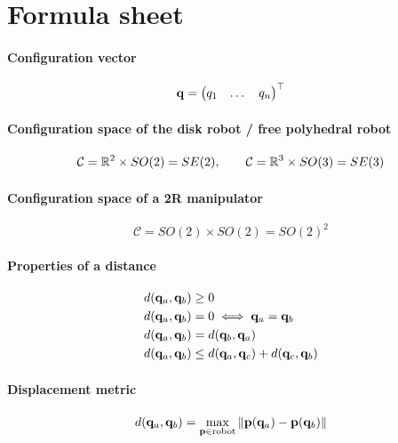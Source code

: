 \chapter*{Formula sheet}

\subsubsection{Configuration vector}
\begin{equation*}
    {\mathbf q}=\begin{pmatrix} q_1 & \dots & q_n \end{pmatrix}^\top
\end{equation*}

\subsubsection{Configuration space of the disk robot / free polyhedral robot}
\begin{equation*}
    \mathcal C={\mathbb R}^2\times SO(2)=SE(2),\qquad \mathcal C={\mathbb R}^3\times SO(3)=SE(3)
\end{equation*}

\subsubsection{Configuration space of a 2R manipulator}
\begin{equation*}
    \mathcal C=SO(2)\times SO(2)=SO(2)^2
\end{equation*}

\subsubsection{Properties of a distance}
\begin{align*}
    &d({\mathbf q}_a,{\mathbf q}_b)\ge 0\\
    &d({\mathbf q}_a,{\mathbf q}_b)=0\iff {\mathbf q}_a={\mathbf q}_b\\
    &d({\mathbf q}_a,{\mathbf q}_b)=d({\mathbf q}_b,{\mathbf q}_a)\\
    &d({\mathbf q}_a,{\mathbf q}_b)\le d({\mathbf q}_a,{\mathbf q}_c)+d({\mathbf q}_c,{\mathbf q}_b)
\end{align*}

\subsubsection{Displacement metric}
\begin{equation*}
    d({\mathbf q}_a,{\mathbf q}_b)=\max_{\mathbf p\in \text{robot}}\|\mathbf p({\mathbf q}_a)-\mathbf p({\mathbf q}_b)\|
\end{equation*}

